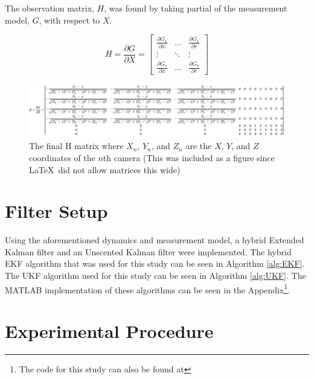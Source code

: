\documentclass[letterpaper, paper,11pt]{AAS}	%
\begin{document}

The observation matrix, $H$, was found by taking partial of the measurement model, $G$, with respect to $X$.

\begin{equation}
\label{eq:H}
H = \frac{\partial G}{\partial X} =
\begin{bmatrix} 
    \frac{\partial G_1}{\partial x} & \dots  & \frac{\partial G_1}{\partial r}\\
    \vdots & \ddots & \vdots\\
    \frac{\partial G_{7}}{\partial x} & \dots  & \frac{\partial G_{7}}{\partial r}
\end{bmatrix} 
\end{equation}

\begin{figure}[htb]
	\centering\includegraphics[width=\textwidth]{Figures/HMatrix}
	\caption{The final H matrix where $X_n$, $Y_n$, and $Z_n$ are the $X$, $Y$, and $Z$ coordinates of the $n$th camera (This was included as a figure since \LaTeX\ did not allow matrices this wide)}
	\label{fig:HMatrix}
\end{figure}

\section{Filter Setup}

Using the aforementioned dynamics and measurement model, a hybrid Extended Kalman filter and an Unscented Kalman filter were implemented. The hybrid EKF algorithm that was used for this study can be seen in Algorithm \ref{alg:EKF}. The UKF algorithm used for this study can be seen in Algorithm \ref{alg:UKF}. The MATLAB implementation of these algorithms can be seen in the Appendix\footnote{The code for this study can also be found at }.

\section{Experimental Procedure}
\end{document}
